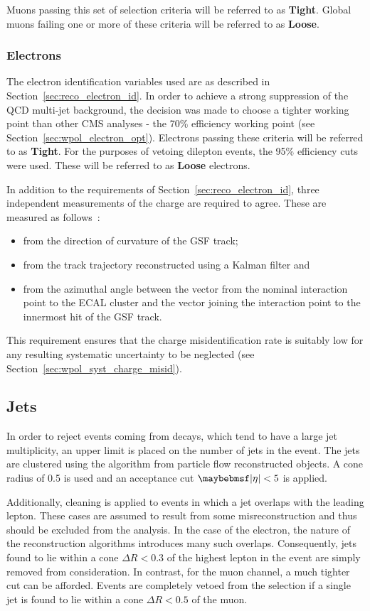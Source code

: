 Muons passing this set of selection criteria will be referred to as
\textbf{Tight}. Global muons failing one or more of these criteria will be
referred to as \textbf{Loose}.

\subsubsection{Electrons}
\label{sec:wpol_electronid}
The electron identification variables used are as described in
Section~\ref{sec:reco_electron_id}. In order to achieve a strong suppression of
the \ac{QCD} multi-jet background, the decision was made to choose a tighter
working point than other \ac{CMS} analyses - the 70\% efficiency working point
(see Section~\ref{sec:wpol_electron_opt}). Electrons passing these criteria will
be referred to as \textbf{Tight}. For the purposes of vetoing dilepton events,
the 95\% efficiency cuts were used. These will be referred to as \textbf{Loose}
electrons.

In addition to the requirements of Section~\ref{sec:reco_electron_id}, three independent
measurements of the charge are required to agree. These are measured as follows~\cite{wcharge_asymm2}:
\begin{itemize}
\item from the direction of curvature of the \ac{GSF} track;
\item from the track trajectory reconstructed using a Kalman filter and
\item from the azimuthal angle between the vector from the nominal interaction
  point to the \ac{ECAL} cluster and the vector joining the interaction point to
  the innermost hit of the \ac{GSF} track.
\end{itemize}
This requirement ensures that the charge misidentification rate is suitably low
for any resulting systematic uncertainty to be neglected (see
Section~\ref{sec:wpol_syst_charge_misid}).

\subsection{Jets}
\label{sec:wpol_jets}
In order to reject events coming from \ttbar decays, which tend to have a large
jet multiplicity, an upper limit is placed on the number of jets in the
event. The jets are clustered using the \antikT algorithm from particle flow
reconstructed objects. A cone radius of 0.5 is used and an acceptance cut
$\modeta < 5$ is applied.

Additionally, cleaning is applied to events in which a jet overlaps with the
leading lepton. These cases are assumed to result from some misreconstruction
and thus should be excluded from the analysis. In the case of the electron, the
nature of the reconstruction algorithms introduces many such
overlaps. Consequently, jets found to lie within a cone $\Delta R < 0.3$ of the
highest \Pt lepton in the event are simply removed from consideration. In
contrast, for the muon channel, a much tighter cut can be afforded. Events are
completely vetoed from the selection if a single jet is found to lie within a
cone $\Delta R < 0.5$ of the muon.


